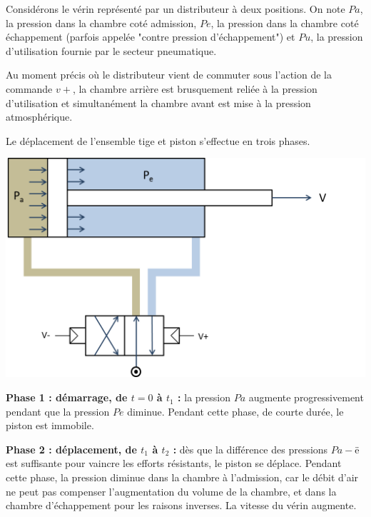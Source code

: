 \documentclass[10pt]{article}
\begin{document}
\begin{minipage}[c]{.53\textwidth}
Considérons le vérin représenté par un distributeur à deux positions. On note $Pa$, la pression dans la chambre coté admission, $Pe$, la pression dans la chambre coté échappement (parfois appelée "contre pression d'échappement") et $Pu$, la pression d'utilisation fournie par le secteur pneumatique. 


Au moment précis où le distributeur vient de commuter sous l'action de la commande $v+$, la chambre arrière est brusquement reliée à la pression d'utilisation et simultanément la chambre avant est mise à la pression atmosphérique.

Le déplacement de l'ensemble tige et piston s'effectue en trois phases.

\end{minipage} \hfill
\begin{minipage}[c]{.45\textwidth}
\begin{center}
\includegraphics[width=\textwidth]{images/fig2}
\end{center}
\end{minipage}


\textbf{Phase 1 : démarrage, de $t=0$ à $t_1$ :} la pression $Pa$ augmente progressivement pendant que la pression $Pe$ diminue. Pendant cette phase, de courte durée, le piston est immobile.

\textbf{Phase 2 : déplacement, de $t_1$ à $t_2$ :} dès que la différence des pressions $Pa-ë$ est suffisante pour vaincre les efforts résistants, le piston se déplace. Pendant cette phase, la pression diminue dans la chambre à l'admission, car le débit d'air ne peut pas compenser l'augmentation du volume de la chambre, et dans la chambre d'échappement pour les raisons inverses. La vitesse du vérin augmente. 
\end{document}
